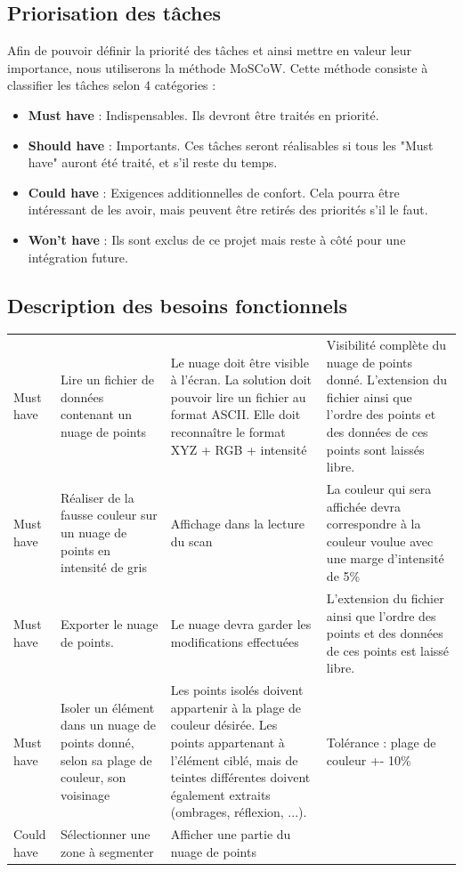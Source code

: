 \documentclass[12pt,titlepage,french]{article}
\begin{document}
\subsection*{Priorisation des tâches}

Afin de pouvoir définir la priorité des tâches et ainsi mettre en valeur leur importance, nous utiliserons la méthode MoSCoW. Cette méthode consiste à classifier les tâches selon 4 catégories :

\begin{itemize}
    \item \textbf{Must have} : Indispensables. Ils devront être traités en priorité.
    \item \textbf{Should have} : Importants. Ces tâches seront réalisables si tous les "Must have" auront été traité, et s'il reste du temps.
    \item \textbf{Could have} : Exigences additionnelles de confort. Cela pourra être intéressant de les avoir, mais peuvent être retirés des priorités s'il le faut.
    \item \textbf{Won't have} : Ils sont exclus de ce projet mais reste à côté pour une intégration future.
\end{itemize}

\subsection*{Description des besoins fonctionnels}

\noindent\begin{tabu} to \toprule
     &&&\\\toprule
Must have
& Lire un fichier de données contenant un nuage de points
& Le nuage doit être visible à l'écran. La solution doit pouvoir lire un fichier au format ASCII. Elle doit reconnaître le format XYZ + RGB + intensité
& Visibilité complète du nuage de points donné. L'extension du fichier ainsi que l'ordre des points et des données de ces points sont laissés libre.\\\midrule
Must have 
& Réaliser de la fausse couleur sur un nuage de points en intensité de gris
& Affichage dans la lecture du scan
& La couleur qui sera affichée devra correspondre à la couleur voulue avec une marge d'intensité de 5\%\\\midrule
Must have 
& Exporter le nuage de points.
& Le nuage devra garder les modifications effectuées
& L'extension du fichier ainsi que l'ordre des points et des données de ces points est laissé libre.\\\midrule
Must have 
& Isoler un élément dans un nuage de points donné, selon sa plage de couleur, son voisinage
& Les points isolés doivent appartenir à la plage de couleur désirée.
Les points appartenant à l'élément ciblé, mais de teintes différentes doivent également extraits (ombrages, réflexion, ...).
& Tolérance : plage de couleur +- 10\% \\\midrule
Could have 
& Sélectionner une zone à segmenter
& Afficher une partie du nuage de points
& \\\bottomrule

\end{tabu}
\end{document}
